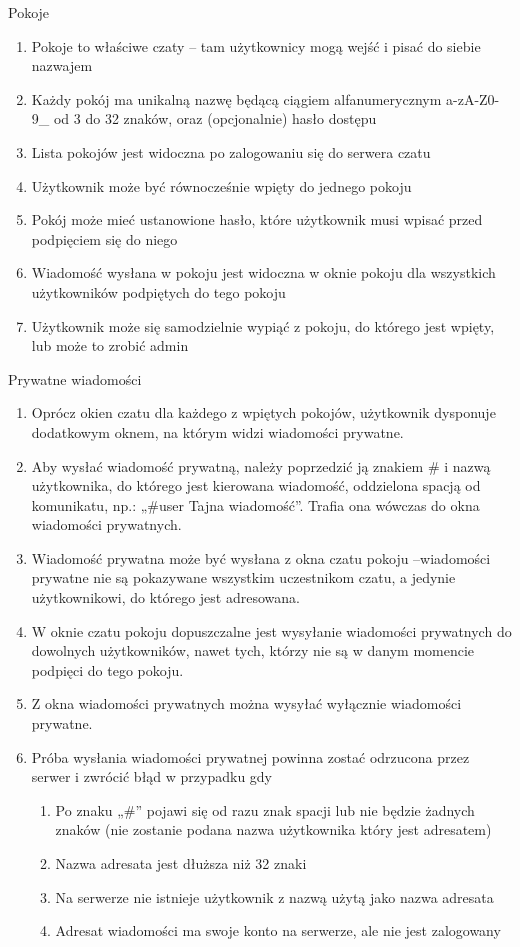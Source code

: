 \documentclass[11pt,oneside,a4paper,onecolumn]{article}
\begin{document}
Pokoje
\begin{enumerate}
\item Pokoje to właściwe czaty – tam użytkownicy mogą wejść i pisać do siebie nazwajem
\item Każdy pokój ma unikalną nazwę będącą ciągiem alfanumerycznym a-zA-Z0-9\_ od 3 do 32 znaków, oraz (opcjonalnie) hasło dostępu
\item Lista pokojów jest widoczna po zalogowaniu się do serwera czatu
\item Użytkownik może być równocześnie wpięty do jednego pokoju
\item Pokój może mieć ustanowione hasło, które użytkownik musi wpisać przed podpięciem się do niego
\item Wiadomość wysłana w pokoju jest widoczna w oknie pokoju dla wszystkich użytkowników podpiętych do tego pokoju
\item Użytkownik może się samodzielnie wypiąć z pokoju, do którego jest wpięty, lub może to zrobić admin
\end{enumerate}

Prywatne wiadomości
\begin{enumerate}
\item Oprócz okien czatu dla każdego z wpiętych pokojów, użytkownik dysponuje dodatkowym oknem, na którym widzi wiadomości prywatne.
\item Aby wysłać wiadomość prywatną, należy poprzedzić ją znakiem \# i nazwą użytkownika, do którego jest kierowana wiadomość, oddzielona spacją od komunikatu, np.: „\#user Tajna wiadomość”. Trafia ona wówczas do okna wiadomości prywatnych.
\item Wiadomość prywatna może być wysłana z okna czatu pokoju –wiadomości prywatne nie są pokazywane wszystkim uczestnikom czatu, a jedynie użytkownikowi, do którego jest adresowana.
\item W oknie czatu pokoju dopuszczalne jest wysyłanie wiadomości prywatnych do dowolnych użytkowników, nawet tych, którzy nie są w danym momencie podpięci do tego pokoju.
\item Z okna wiadomości prywatnych można wysyłać wyłącznie wiadomości prywatne.
\item Próba wysłania wiadomości prywatnej powinna zostać odrzucona przez serwer i zwrócić błąd w przypadku gdy
\begin{enumerate}
\item Po znaku „\#” pojawi się od razu znak spacji lub nie będzie żadnych znaków (nie zostanie podana nazwa użytkownika który jest adresatem)
\item Nazwa adresata jest dłuższa niż 32 znaki
\item Na serwerze nie istnieje użytkownik z nazwą użytą jako nazwa adresata
\item Adresat wiadomości ma swoje konto na serwerze, ale nie jest zalogowany
\end{enumerate}
\end{enumerate}
\end{document}
